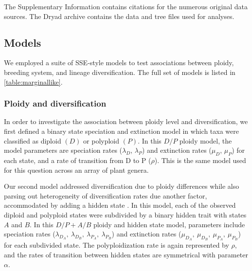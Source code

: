The Supplementary Information contains citations for the numerous original data sources. %
The Dryad archive contains the data and tree files used for analyses. %

\subsection{Models}

We employed a suite of SSE-style models \citep[BiSSE, MuSSE, HiSSE;][]{maddison_2007, fitzjohn_2012, beaulieu_2016} to test associations between ploidy, breeding system, and lineage diversification.
The full set of models is listed in \cref{table:marginallike}.

\subsubsection{Ploidy and diversification}

In order to investigate the association between ploidy level and diversification, we first defined a binary state speciation and extinction model \citep[BiSSE,][]{maddison_2007} in which taxa were classified as diploid $(D)$ or polyploid $(P)$.
In this $D/P$ ploidy model, the model parameters are speciation rates ($\lambda_D$, $\lambda_P$) and extinction rates ($\mu_D$, $\mu_P$) for each state, and a rate of transition from D to P ($\rho$).
This is the same model \citet{mayrose_2011} used for this question across an array of plant genera.


Our second model addressed diversification due to ploidy differences while also parsing out heterogeneity of diversification rates due another factor, accommodated by adding a hidden state \citep[HiSSE,][]{beaulieu_2016}. %
In this model, each of the observed diploid and polyploid states were subdivided by a binary hidden trait with states $A$ and $B$.
In this $D/P+A/B$ ploidy and hidden state model, parameters include speciation rates ($\lambda_{D_A},\ \lambda_{D_B},\ \lambda_{P_A},\ \lambda_{P_B}$) and extinction rates ($\mu_{D_A},\ \mu_{D_B},\ \mu_{P_A},\ \mu_{P_B}$) for each subdivided state.
The polyploidization rate is again represented by $\rho$, and the rates of transition between hidden states are symmetrical with parameter $\alpha$.  %

